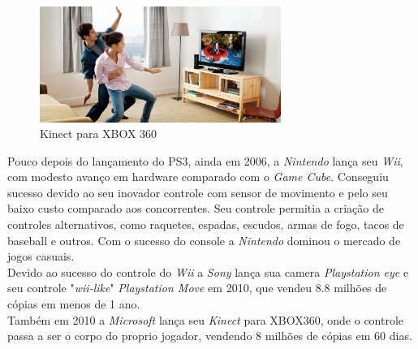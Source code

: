 \documentclass[paper=a4, fontsize=11pt]{scrartcl}	%
\numberwithin{equation}{section}															%
\numberwithin{figure}{section}																%
\numberwithin{table}{section}																%
\begin{document}
\begin{figure}[h!]
	\centering
    \includegraphics[width=0.7\textwidth]{img/kinect}
    \caption{Kinect para XBOX 360}
\end{figure}
Pouco depois do lançamento do PS3, ainda em 2006, a \textit{Nintendo} lança seu \textit{Wii}, com modesto avanço em hardware comparado com o \textit{Game Cube}. Conseguiu sucesso devido ao seu inovador controle com sensor de movimento e pelo seu baixo custo comparado aos concorrentes. Seu controle permitia a criação de controles alternativos, como raquetes, espadas, escudos, armas de fogo, tacos de baseball e outros. Com o sucesso do console a \textit{Nintendo} dominou o mercado de jogos casuais.\\
Devido ao sucesso do controle do \textit{Wii} a \textit{Sony} lança sua camera \textit{Playstation eye} e seu controle "\textit{wii-like}" \textit{Playstation Move} em 2010, que vendeu 8.8 milhões de cópias em menos de 1 ano.\\
Também em 2010 a \textit{Microsoft} lança seu \textit{Kinect} para XBOX360, onde o controle passa a ser o corpo do proprio jogador, vendendo 8 milhões de cópias em 60 dias.
\end{document}
